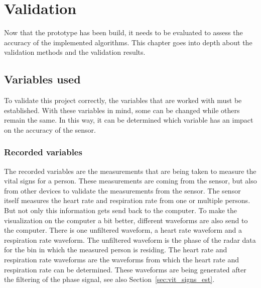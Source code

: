 \chapter{Validation}
\label{chp:validation}

Now that the prototype has been build, it needs to be evaluated to assess the accuracy of the implemented algorithms. This chapter goes into depth about the validation methods and the validation results.

\section{Variables used}
To validate this project correctly, the variables that are worked with must be established. With these variables in mind, some can be changed while others remain the same. In this way, it can be determined which variable has an impact on the accuracy of the sensor. 

\subsection{Recorded variables}
The recorded variables are the measurements that are being taken to measure the vital signs for a person. These measurements are coming from the sensor, but also from other devices to validate the measurements from the sensor. The sensor itself measures the heart rate and respiration rate from one or multiple persons. But not only this information gets send back to the computer. To make the visualization on the computer a bit better, different waveforms are also send to the computer. There is one unfiltered waveform, a heart rate waveform and a respiration rate waveform. The unfiltered waveform is the phase of the radar data for the bin in which the measured person is residing. The heart rate and respiration rate waveforms are the waveforms from which the heart rate and respiration rate can be determined. These waveforms are being generated after the filtering of the phase signal, see also Section~\ref{sec:vit_signs_est}. 

